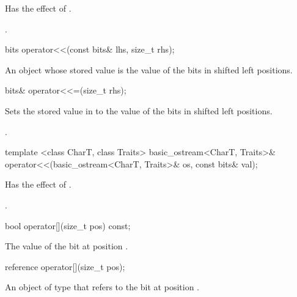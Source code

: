 \begin{itemdescr}
\effects Has the effect of .

\returns {}.		
\end{itemdescr}

\begin{itemdecl}
bits operator<<(const bits& lhs, size_t rhs);		
\end{itemdecl}

\begin{itemdescr}
\returns An object whose stored value is the value of the bits in  shifted left  positions.		
\end{itemdescr}

\begin{itemdecl}
bits& operator<<=(size_t rhs);		
\end{itemdecl}

\begin{itemdescr}
\effects Sets the stored value in  to the value of the bits in  shifted left  positions.

\returns {}.		
\end{itemdescr}

\begin{itemdecl}
template <class CharT, class Traits>
  basic_ostream<CharT, Traits>& operator<<(basic_ostream<CharT, Traits>& os,
                                           const bits& val);		
\end{itemdecl}

\begin{itemdescr}
\effects Has the effect of .

\returns {}.		
\end{itemdescr}

\begin{itemdecl}
bool operator[](size_t pos) const;		
\end{itemdecl}

\begin{itemdescr}
\returns The value of the bit at position .		
\end{itemdescr}

\begin{itemdecl}
reference operator[](size_t pos);		
\end{itemdecl}

\begin{itemdescr}
\returns An object of type  that refers to the bit at position .		
\end{itemdescr}


